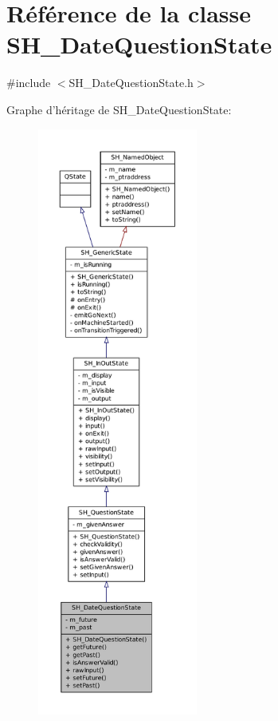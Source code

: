 \hypertarget{classSH__DateQuestionState}{\section{Référence de la classe S\-H\-\_\-\-Date\-Question\-State}
\label{classSH__DateQuestionState}
}


{\ttfamily \#include $<$S\-H\-\_\-\-Date\-Question\-State.\-h$>$}



Graphe d'héritage de S\-H\-\_\-\-Date\-Question\-State\-:
\nopagebreak
\begin{figure}[H]
\begin{center}
\leavevmode
\includegraphics[height=550pt]{classSH__DateQuestionState__inherit__graph}
\end{center}
\end{figure}


